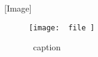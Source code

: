 [Image]

\begin{center}
\begin{figure}[H]
	\begin{center}
  \texttt{[image: ~file~]}
  \caption{~caption~}
  \end{center}
\end{figure}
\end{center}
